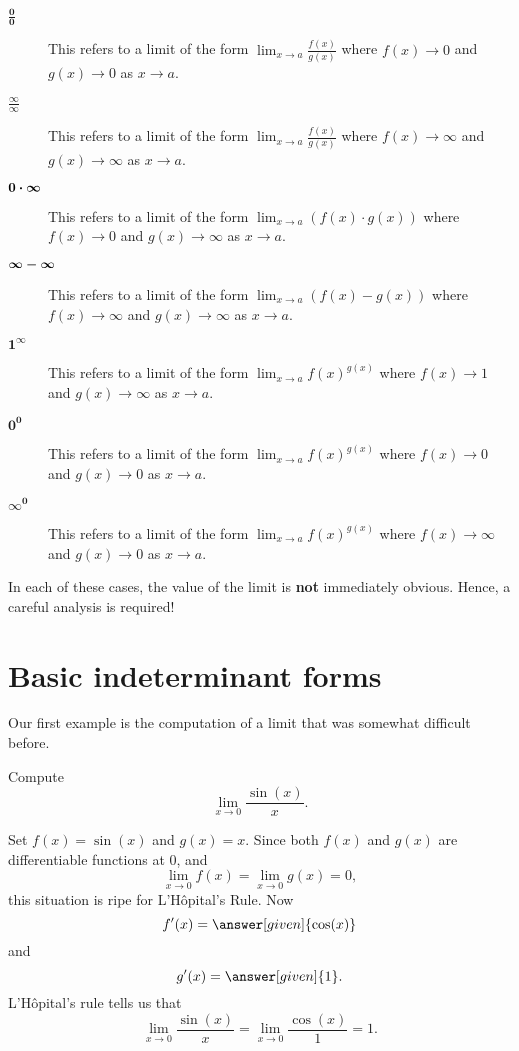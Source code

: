 \documentclass{ximera}
\begin{document}
\begin{definition}\hfil
\begin{description}
\item[\ensuremath{\boldsymbol{\tfrac{0}{0}}}] This refers to a limit of the form $\lim_{x\to a}
  \frac{f(x)}{g(x)}$ where $f(x)\to 0$ and $g(x)\to 0$ as $x\to a$.
\item[\ensuremath{\boldsymbol{\tfrac{\infty}{\infty}}}] This refers to a limit of the form $\lim_{x\to a}
  \frac{f(x)}{g(x)}$ where $f(x)\to \infty$ and $g(x)\to \infty$ as $x\to a$.
\item[\ensuremath{\small\boldsymbol{0\cdot \infty}}] This refers to a limit of the form $\lim_{x\to a}
  \left(f(x)\cdot g(x)\right)$ where $f(x)\to 0$ and $g(x)\to \infty$ as $x\to a$.
\item[\ensuremath{\small\boldsymbol{\infty - \infty}}] This refers to a limit of the form $\lim_{x\to a}\left(
  f(x)-g(x)\right)$ where $f(x)\to \infty$ and $g(x)\to \infty$ as $x\to a$.
\item[\ensuremath{\boldsymbol{1^\infty}}] This refers to a limit of the form $\lim_{x\to a}
  f(x)^{g(x)}$ where $f(x)\to 1$ and $g(x)\to \infty$ as $x\to a$.
\item[\ensuremath{\boldsymbol{0^0}}] This refers to a limit of the form $\lim_{x\to a}
  f(x)^{g(x)}$ where $f(x)\to 0$ and $g(x)\to 0$ as $x\to a$.
\item[\ensuremath{\boldsymbol{\infty^0}}] This refers to a limit of the form $\lim_{x\to a}
  f(x)^{g(x)}$ where $f(x)\to \infty$ and $g(x)\to 0$ as $x\to a$.
\end{description}
In each of these cases, the value of the limit is \textbf{not} immediately
obvious. Hence, a careful analysis is required!
\end{definition}

\section{Basic indeterminant forms}


Our first example is the computation of a limit that was somewhat
difficult before.

\begin{example}
Compute
\[
\lim_{x\to 0} \frac{\sin(x)}{x}.
\]
\begin{explanation}
Set $f(x) = \sin(x)$ and $g(x) = x$.  Since both $f(x)$ and $g(x)$ are
differentiable functions at $0$, and 
\[
\lim_{x \to 0} f(x) = \lim_{x \to 0}g(x) = 0,
\]
this situation is ripe for L'H\^{o}pital's Rule. Now
\[
f'(x) = \answer[given]{\cos(x)}
\]
and
\[
g'(x) = \answer[given]{1}.
\] 
L'H\^{o}pital's rule tells us that 
\[
\lim_{x \to 0} \frac{\sin(x)}{x} = \lim_{x \to 0} \frac{\cos(x)}{1} = 1.
\]
\end{explanation}
\end{example}
\end{document}

